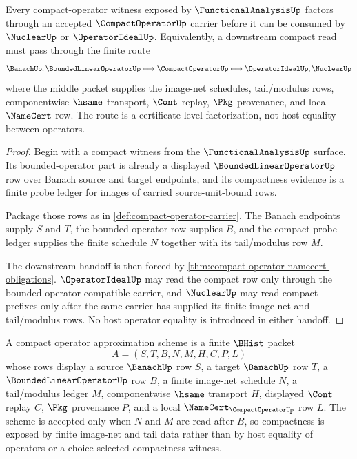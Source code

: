 \begin{theorem}
\label{thm:compact-operator-functional-analysis-route}
Every compact-operator witness exposed by $\FunctionalAnalysisUp$ factors through an accepted $\CompactOperatorUp$ carrier before it can be consumed by $\NuclearUp$ or $\OperatorIdealUp$. Equivalently, a downstream compact read must pass through the finite route
$$
\BanachUp,\BoundedLinearOperatorUp\longmapsto \CompactOperatorUp\longmapsto \OperatorIdealUp,\NuclearUp
$$
where the middle packet supplies the image-net schedules, tail/modulus rows, componentwise $\hsame$ transport, $\Cont$ replay, $\Pkg$ provenance, and local $\NameCert$ row. The route is a certificate-level factorization, not host equality between operators.
\end{theorem}
\begin{proof}
Begin with a compact witness from the $\FunctionalAnalysisUp$ surface. Its bounded-operator part is already a displayed $\BoundedLinearOperatorUp$ row over Banach source and target endpoints, and its compactness evidence is a finite probe ledger for images of carried source-unit-bound rows.

Package those rows as in \autoref{def:compact-operator-carrier}. The Banach endpoints supply $S$ and $T$, the bounded-operator row supplies $B$, and the compact probe ledger supplies the finite schedule $N$ together with its tail/modulus row $M$.

The downstream handoff is then forced by \autoref{thm:compact-operator-namecert-obligations}. $\OperatorIdealUp$ may read the compact row only through the bounded-operator-compatible carrier, and $\NuclearUp$ may read compact prefixes only after the same carrier has supplied its finite image-net and tail/modulus rows. No host operator equality is introduced in either handoff.
\end{proof}

\begin{definition}
\label{def:compact-operator-approximation-scheme}
A compact operator approximation scheme is a finite $\BHist$ packet
$$
A=(S,T,B,N,M,H,C,P,L)
$$
whose rows display a source $\BanachUp$ row $S$, a target $\BanachUp$ row $T$, a $\BoundedLinearOperatorUp$ row $B$, a finite image-net schedule $N$, a tail/modulus ledger $M$, componentwise $\hsame$ transport $H$, displayed $\Cont$ replay $C$, $\Pkg$ provenance $P$, and a local $\NameCert_{\CompactOperatorUp}$ row $L$. The scheme is accepted only when $N$ and $M$ are read after $B$, so compactness is exposed by finite image-net and tail data rather than by host equality of operators or a choice-selected compactness witness.
\end{definition}

